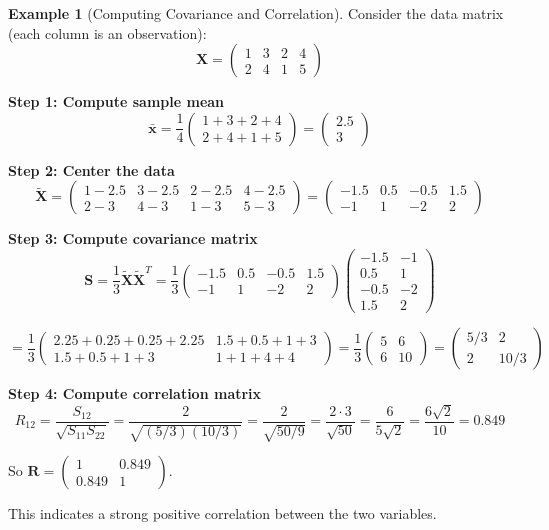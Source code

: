 \documentclass[12pt]{article}
\numberwithin{equation}{section}
\newcommand{\vect}[1]{\boldsymbol{#1}}   %
\newcommand{\mat}[1]{\mathbf{#1}}        %
\theoremstyle{plain}
\theoremstyle{definition}
\newtheorem{example}[theorem]{Example}
\theoremstyle{remark}
\begin{document}
\begin{example}[Computing Covariance and Correlation]
Consider the data matrix (each column is an observation):
$$\mat{X} = \begin{pmatrix} 1 & 3 & 2 & 4 \\ 2 & 4 & 1 & 5 \end{pmatrix}$$

\textbf{Step 1: Compute sample mean}
$$\bar{\vect{x}} = \frac{1}{4}\begin{pmatrix} 1+3+2+4 \\ 2+4+1+5 \end{pmatrix} = \begin{pmatrix} 2.5 \\ 3 \end{pmatrix}$$

\textbf{Step 2: Center the data}
$$\tilde{\mat{X}} = \begin{pmatrix} 1-2.5 & 3-2.5 & 2-2.5 & 4-2.5 \\ 2-3 & 4-3 & 1-3 & 5-3 \end{pmatrix} = \begin{pmatrix} -1.5 & 0.5 & -0.5 & 1.5 \\ -1 & 1 & -2 & 2 \end{pmatrix}$$

\textbf{Step 3: Compute covariance matrix}
$$\mat{S} = \frac{1}{3}\tilde{\mat{X}}\tilde{\mat{X}}^T = \frac{1}{3}\begin{pmatrix} -1.5 & 0.5 & -0.5 & 1.5 \\ -1 & 1 & -2 & 2 \end{pmatrix}\begin{pmatrix} -1.5 & -1 \\ 0.5 & 1 \\ -0.5 & -2 \\ 1.5 & 2 \end{pmatrix}$$

$$= \frac{1}{3}\begin{pmatrix} 2.25+0.25+0.25+2.25 & 1.5+0.5+1+3 \\ 1.5+0.5+1+3 & 1+1+4+4 \end{pmatrix} = \frac{1}{3}\begin{pmatrix} 5 & 6 \\ 6 & 10 \end{pmatrix} = \begin{pmatrix} 5/3 & 2 \\ 2 & 10/3 \end{pmatrix}$$

\textbf{Step 4: Compute correlation matrix}
$$R_{12} = \frac{S_{12}}{\sqrt{S_{11}S_{22}}} = \frac{2}{\sqrt{(5/3)(10/3)}} = \frac{2}{\sqrt{50/9}} = \frac{2 \cdot 3}{\sqrt{50}} = \frac{6}{5\sqrt{2}} = \frac{6\sqrt{2}}{10} = 0.849$$

So $\mat{R} = \begin{pmatrix} 1 & 0.849 \\ 0.849 & 1 \end{pmatrix}$.

This indicates a strong positive correlation between the two variables.
\end{example}
\end{document}
